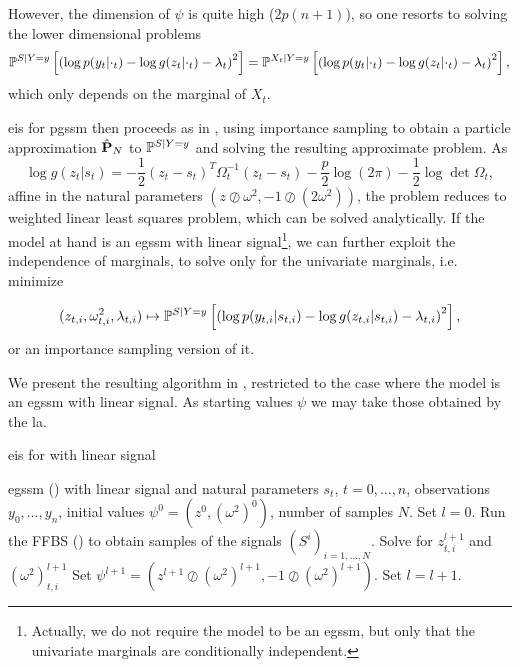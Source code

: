 However, the dimension of $\psi$ is quite high ($2p(n+1)$), so one resorts to solving the lower dimensional problems 
$$
    \Pps \left[ \left( \log p(y_{t}|\cdot_{t}) -  \log g(z_{t}|\cdot_{t}) - \lambda_{t} \right)^{2} \right] = \mathbb P^{X_{t}|Y=y} \left[ \left( \log p(y_{t}|\cdot_{t}) -  \log g(z_{t}|\cdot_{t}) - \lambda_{t} \right)^{2} \right],
$$
which only depends on the marginal of $X_{t}$.

\acrshort{eis} for \acrshort{pgssm} then proceeds as in , using importance sampling to obtain a particle approximation $\hat \P_{N}$ to $\Pps$ and solving the resulting approximate problem. As 
$$
    \log g(z_{t}|s_{t}) = - \frac{1}{2} (z_{t} - s_{t})^{T}\Omega_{t}^{-1}(z_{t} - s_{t})- \frac{p}{2}\log (2\pi) - \frac{1}{2} \log\det \Omega_{t},
$$
affine in the natural parameters $\left( z \oslash \omega^{2}, -1 \oslash (2\omega^{2}) \right)$, the problem reduces to weighted linear least squares problem, which can be solved analytically. If the model at hand is an \acrshort{egssm} with linear signal\footnote{Actually, we do not require the model to be an \acrshort{egssm}, but only that the univariate marginals are conditionally independent.}, we can further exploit the independence of marginals, to solve only for the univariate marginals, i.e. minimize

\begin{align}
    \label{eq:eis-marignals-target}
    (z_{t,i}, \omega^{2}_{t,i}, \lambda_{t,i}) \mapsto \Pps \left[ \left( \log p(y_{t,i}|s_{t,i}) - \log g(z_{t,i}|s_{t,i}) - \lambda_{t,i} \right)^{2} \right],
\end{align}
or an importance sampling version of it.

We present the resulting algorithm in , restricted to the case where the model is an \acrshort{egssm} with linear signal. As starting values $\psi$ we may take those obtained by the \acrshort{la}. 

\begin{algorithm}
    \caption{\gls{eis} for  with linear signal}
    \label{alg:eis}
    \begin{algorithmic}[1]
        \Require \acrshort{egssm} () with linear signal and natural parameters $s_{t}$, $t = 0, \dots, n$, observations $y_{0}, \dots, y_{n}$, initial values $\psi^{0} = \left( z^{0}, (\omega^{2})^{0} \right)$, number of samples $N$.
        \State Set $l = 0$.
        \Repeat
            \State Run the FFBS () to obtain samples of the signals $(S^{i})_{i = 1, \dots, N}$. 
                    \State Solve  for $z^{l + 1}_{t,i}$ and $(\omega^{2})^{l + 1}_{t,i}$ 
                \EndFor
            \EndFor
            \State Set $\psi^{l + 1} = \left( z^{l + 1} \oslash (\omega^{2})^{l + 1}, -1 \oslash (\omega^{2})^{l + 1}\right)$.
            \State Set $l = l +1$.
        
    \end{algorithmic}
\end{algorithm}

